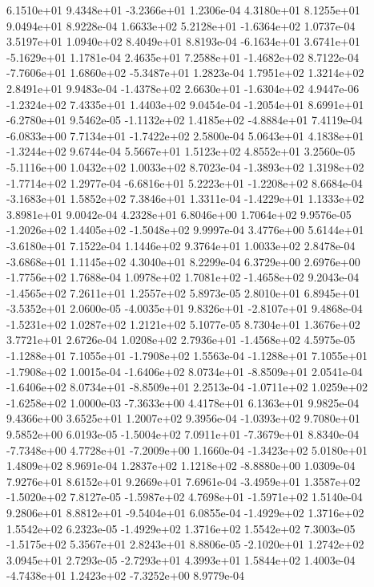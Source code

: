  6.1510e+01  9.4348e+01 -3.2366e+01  1.2306e-04
4.3180e+01 8.1255e+01 9.0494e+01  8.9228e-04
 1.6633e+02  5.2128e+01 -1.6364e+02  1.0737e-04
3.5197e+01 1.0940e+02 8.4049e+01  8.8193e-04
-6.1634e+01  3.6741e+01 -5.1629e+01  1.1781e-04
 2.4635e+01  7.2588e+01 -1.4682e+02  8.7122e-04
-7.7606e+01  1.6860e+02 -5.3487e+01  1.2823e-04
1.7951e+02 1.3214e+02 2.8491e+01  9.9483e-04
-1.4378e+02  2.6630e+01 -1.6304e+02  4.9447e-06
-1.2324e+02  7.4335e+01  1.4403e+02  9.0454e-04
-1.2054e+01  8.6991e+01 -6.2780e+01  9.5462e-05
-1.1132e+02  1.4185e+02 -4.8884e+01  7.4119e-04
-6.0833e+00  7.7134e+01 -1.7422e+02  2.5800e-04
 5.0643e+01  4.1838e+01 -1.3244e+02  9.6744e-04
5.5667e+01 1.5123e+02 4.8552e+01  3.2560e-05
-5.1116e+00  1.0432e+02  1.0033e+02  8.7023e-04
-1.3893e+02  1.3198e+02 -1.7714e+02  1.2977e-04
-6.6816e+01  5.2223e+01 -1.2208e+02  8.6684e-04
-3.1683e+01  1.5852e+02  7.3846e+01  1.3311e-04
-1.4229e+01  1.1333e+02  3.8981e+01  9.0042e-04
4.2328e+01 6.8046e+00 1.7064e+02  9.9576e-05
-1.2026e+02  1.4405e+02 -1.5048e+02  9.9997e-04
 3.4776e+00  5.6144e+01 -3.6180e+01  7.1522e-04
1.1446e+02 9.3764e+01 1.0033e+02  2.8478e-04
-3.6868e+01  1.1145e+02  4.3040e+01  8.2299e-04
 6.3729e+00  2.6976e+00 -1.7756e+02  1.7688e-04
 1.0978e+02  1.7081e+02 -1.4658e+02  9.2043e-04
-1.4565e+02  7.2611e+01  1.2557e+02  5.8973e-05
 2.8010e+01  6.8945e+01 -3.5352e+01  2.0600e-05
-4.0035e+01  9.8326e+01 -2.8107e+01  9.4868e-04
-1.5231e+02  1.0287e+02  1.2121e+02  5.1077e-05
8.7304e+01 1.3676e+02 3.7721e+01  2.6726e-04
 1.0208e+02  2.7936e+01 -1.4568e+02  4.5975e-05
-1.1288e+01  7.1055e+01 -1.7908e+02  1.5563e-04
-1.1288e+01  7.1055e+01 -1.7908e+02  1.0015e-04
-1.6406e+02  8.0734e+01 -8.8509e+01  2.0541e-04
-1.6406e+02  8.0734e+01 -8.8509e+01  2.2513e-04
-1.0711e+02  1.0259e+02 -1.6258e+02  1.0000e-03
-7.3633e+00  4.4178e+01  6.1363e+01  9.9825e-04
9.4366e+00 3.6525e+01 1.2007e+02  9.3956e-04
-1.0393e+02  9.7080e+01  9.5852e+00  6.0193e-05
-1.5004e+02  7.0911e+01 -7.3679e+01  8.8340e-04
-7.7348e+00  4.7728e+01 -7.2009e+00  1.1660e-04
-1.3423e+02  5.0180e+01  1.4809e+02  8.9691e-04
 1.2837e+02  1.1218e+02 -8.8880e+00  1.0309e-04
7.9276e+01 8.6152e+01 9.2669e+01  7.6961e-04
-3.4959e+01  1.3587e+02 -1.5020e+02  7.8127e-05
-1.5987e+02  4.7698e+01 -1.5971e+02  1.5140e-04
 9.2806e+01  8.8812e+01 -9.5404e+01  6.0855e-04
-1.4929e+02  1.3716e+02  1.5542e+02  6.2323e-05
-1.4929e+02  1.3716e+02  1.5542e+02  7.3003e-05
-1.5175e+02  5.3567e+01  2.8243e+01  8.8806e-05
-2.1020e+01  1.2742e+02  3.0945e+01  2.7293e-05
-2.7293e+01  4.3993e+01  1.5844e+02  1.4003e-04
-4.7438e+01  1.2423e+02 -7.3252e+00  8.9779e-04
